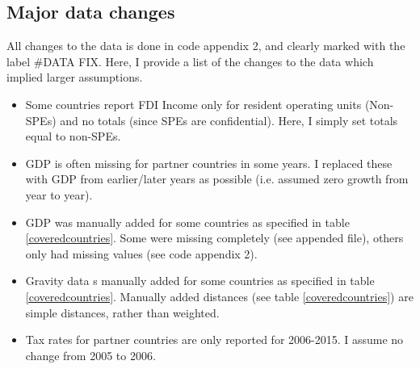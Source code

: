 \documentclass[twoside,a4paper,11pt]{article}
\begin{document}
\subsection{Major data changes}\label{AppFixes}
All changes to the data is done in code appendix 2, and clearly marked with the label \#DATA FIX. Here, I provide a list of the changes to the data which implied larger assumptions. \begin{itemize}
	\item Some countries report FDI Income only for resident operating units (Non-SPEs) and no totals (since SPEs are confidential). Here, I simply set totals equal to non-SPEs.
	\item  GDP is often missing for partner countries in some years. I replaced these with GDP from earlier/later years as possible (i.e. assumed zero growth from year to year).
	\item GDP was manually added for some countries as specified in table \ref{coveredcountries}. Some were missing completely (see appended file), others only had missing values (see code appendix 2).
	\item Gravity data s manually added for some countries as specified in table \ref{coveredcountries}. 	Manually added distances (see table \ref{coveredcountries}) are simple distances, rather than weighted.
	\item Tax rates for partner countries are only reported for 2006-2015. I assume no change from 2005 to 2006. 
\end{itemize}
\end{document}
